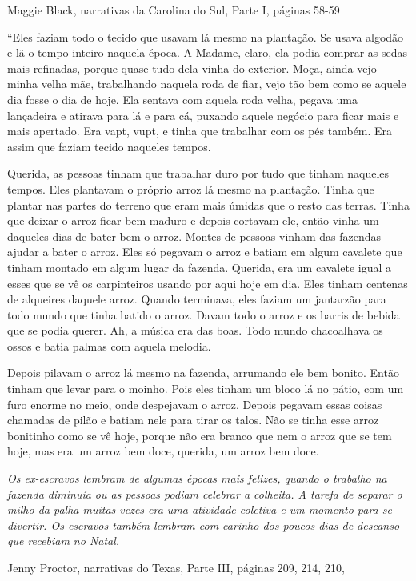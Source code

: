 Maggie Black, narrativas da Carolina do Sul, Parte I, páginas 58-59

``Eles faziam todo o tecido que usavam lá mesmo na plantação. Se usava
algodão e lã o tempo inteiro naquela época. A Madame, claro, ela podia
comprar as sedas mais refinadas, porque quase tudo dela vinha do
exterior. Moça, ainda vejo minha velha mãe, trabalhando naquela roda de
fiar, vejo tão bem como se aquele dia fosse o dia de hoje. Ela sentava
com aquela roda velha, pegava uma lançadeira e atirava para lá e para
cá, puxando aquele negócio para ficar mais e mais apertado. Era vapt,
vupt, e tinha que trabalhar com os pés também. Era assim que faziam
tecido naqueles tempos.

Querida, as pessoas tinham que trabalhar duro por tudo que tinham
naqueles tempos. Eles plantavam o próprio arroz lá mesmo na plantação.
Tinha que plantar nas partes do terreno que eram mais úmidas que o resto
das terras. Tinha que deixar o arroz ficar bem maduro e depois cortavam
ele, então vinha um daqueles dias de bater bem o arroz. Montes de
pessoas vinham das fazendas ajudar a bater o arroz. Eles só pegavam o
arroz e batiam em algum cavalete que tinham montado em algum lugar da
fazenda. Querida, era um cavalete igual a esses que se vê os
carpinteiros usando por aqui hoje em dia. Eles tinham centenas de
alqueires daquele arroz. Quando terminava, eles faziam um jantarzão para
todo mundo que tinha batido o arroz. Davam todo o arroz e os barris de
bebida que se podia querer. Ah, a música era das boas. Todo mundo
chacoalhava os ossos e batia palmas com aquela melodia.

Depois pilavam o arroz lá mesmo na fazenda, arrumando ele bem bonito.
Então tinham que levar para o moinho. Pois eles tinham um bloco lá no
pátio, com um furo enorme no meio, onde despejavam o arroz. Depois
pegavam essas coisas chamadas de pilão e batiam nele para tirar os
talos. Não se tinha esse arroz bonitinho como se vê hoje, porque não era
branco que nem o arroz que se tem hoje, mas era um arroz bem doce,
querida, um arroz bem doce.

\emph{Os ex-escravos lembram de algumas épocas mais felizes, quando o
trabalho na fazenda diminuía ou as pessoas podiam celebrar a colheita. A
tarefa de separar o milho da palha muitas vezes era uma atividade
coletiva e um momento para se divertir. Os escravos também lembram com
carinho dos poucos dias de descanso que recebiam no Natal.}

Jenny Proctor, narrativas do Texas, Parte III, páginas 209, 214, 210,

